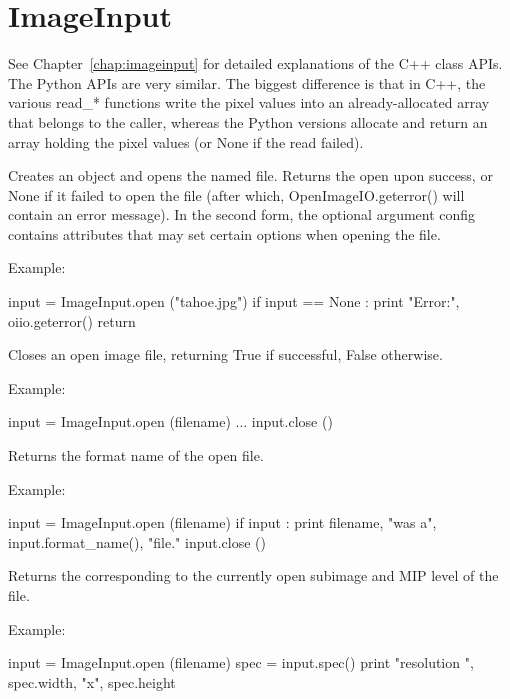 \section{ImageInput}
\label{sec:pythonimageinput}

See Chapter~\ref{chap:imageinput} for detailed explanations of the
C++ \ImageInput class APIs. The Python APIs are very similar. The biggest
difference is that in C++, the various {\cf read_*} functions write the
pixel values into an already-allocated array that belongs to the caller,
whereas the Python versions allocate and return an array holding the pixel
values (or {\cf None} if the read failed).


Creates an \ImageInput object and opens the named file.  Returns the
open \ImageInput upon success, or {\cf None} if it failed to open the
file (after which, {\cf OpenImageIO.geterror()} will contain an error
message).  In the second form, the optional \ImageSpec argument 
{\cf config} contains attributes that may set certain options when opening
the file.

\noindent Example:
\begin{code}
    input = ImageInput.open ("tahoe.jpg")
    if input == None :
        print "Error:", oiio.geterror()
        return
\end{code}
\apiend

Closes an open image file, returning {\cf True} if successful, {\cf False}
otherwise.

\noindent Example:
\begin{code}
    input = ImageInput.open (filename)
    ...
    input.close ()
\end{code}
\apiend


Returns the format name of the open file.

\noindent Example:
\begin{code}
    input = ImageInput.open (filename)
    if input :
        print filename, "was a", input.format_name(), "file."
        input.close ()
  
\end{code}
\apiend

Returns the \ImageSpec corresponding to the currently open subimage and
MIP level of the file.

\noindent Example:
\begin{code}
    input = ImageInput.open (filename)
    spec = input.spec()
    print "resolution ", spec.width, "x", spec.height
\end{code}
\apiend

